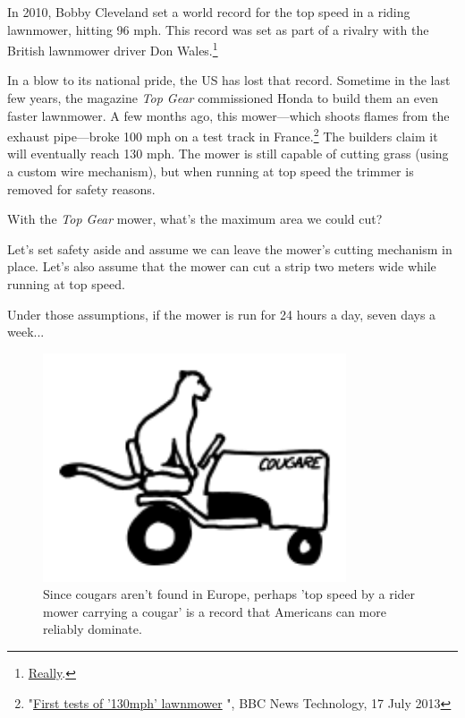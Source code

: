 {{In 2010, Bobby Cleveland set a world record for the top speed in a riding lawnmower, hitting 96 mph. This record was set as part of a rivalry with the British lawnmower driver Don Wales.{\footnote{ \href{http://reviews.cnet.com/8301-13746\_7-20017942-48.html}{Really}.} } }

{In a blow to its national pride, the US has lost that record. Sometime in the last few years, the magazine \emph{Top Gear} commissioned Honda to build them an even faster lawnmower. A few months ago, this mower—which shoots flames from the exhaust pipe—broke 100 mph on a test track in France.{\footnote{"\href{http://www.bbc.co.uk/news/technology-23342347}{First tests of '130mph' lawnmower} ", BBC News Technology, 17 July 2013} } The builders claim it will eventually reach 130 mph. The mower is still capable of cutting grass (using a custom wire mechanism), but when running at top speed the trimmer is removed for safety reasons.}

{With the \emph{Top Gear} mower, what's the maximum area we could cut?}

{Let's set safety aside and assume we can leave the mower's cutting mechanism in place. Let's also assume that the mower can cut a strip two meters wide while running at top speed.}

{Under those assumptions, if the mower is run for 24 hours a day, seven days a week...}

\begin{figure}[!htbp]
\centering
\includegraphics[scale=0.5, max width=0.8\textwidth]{imgs/a/70/lawn_cougar_2.png}
\caption{Since cougars aren't found in Europe, perhaps 'top speed by a rider mower carrying a cougar' is a record that Americans can more reliably dominate.}
\end{figure}

}
